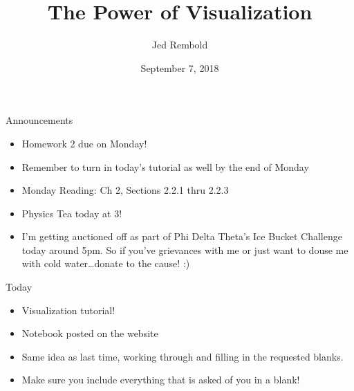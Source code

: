 \documentclass[pdf,aspectratio=169]{beamer}
\title{The Power of Visualization}
\date{September 7, 2018}
\author{Jed Rembold}
\begin{document}
\renewcommand{\theenumi}{\Alph{enumi}}

\begin{frame}{Announcements}
	\begin{itemize}
		\item Homework 2 due on Monday!
		\item Remember to turn in today's tutorial as well by the end of Monday
		\item Monday Reading: Ch 2, Sections 2.2.1 thru 2.2.3
		\item Physics Tea today at 3!
		\item I'm getting auctioned off as part of Phi Delta Theta's Ice Bucket Challenge today around 5pm. So if you've grievances with me or just want to douse me with cold water\ldots donate to the cause! :)
	\end{itemize}
\end{frame}

\begin{frame}{Today}
	\begin{itemize}
		\item Visualization tutorial!
		\item Notebook posted on the website
		\item Same idea as last time, working through and filling in the requested blanks.
		\item Make sure you include everything that is asked of you in a blank!
	\end{itemize}
\end{frame}
\end{document}
